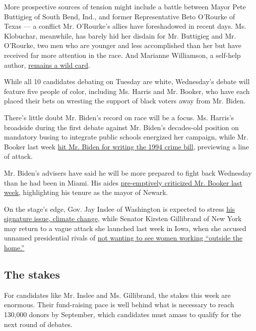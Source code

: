 More prospective sources of tension might include a battle between Mayor
Pete Buttigieg of South Bend, Ind., and former Representative Beto
O'Rourke of Texas --- a conflict Mr. O'Rourke's allies have foreshadowed
in recent days. Ms. Klobuchar, meanwhile, has barely hid her disdain for
Mr. Buttigieg and Mr. O'Rourke, two men who are younger and less
accomplished than her but have received far more attention in the race.
And Marianne Williamson, a self-help author,
\href{https://www.nytimes3xbfgragh.onion/2019/07/27/us/politics/marianne-williamson-mental-health.html}{remains
a wild card}.

While all 10 candidates debating on Tuesday are white, Wednesday's
debate will feature five people of color, including Ms. Harris and Mr.
Booker, who have each placed their bets on wresting the support of black
voters away from Mr. Biden.

There's little doubt Mr. Biden's record on race will be a focus. Ms.
Harris's broadside during the first debate against Mr. Biden's
decades-old position on mandatory busing to integrate public schools
energized her campaign, while Mr. Booker last week
\href{https://www.nytimes3xbfgragh.onion/2019/07/23/us/politics/biden-criminal-justice.html}{hit
Mr. Biden for writing the 1994 crime bill}, previewing a line of attack.

Mr. Biden's advisers have said he will be more prepared to fight back
Wednesday than he had been in Miami. His aides
\href{https://www.nytimes3xbfgragh.onion/2019/07/25/us/politics/biden-booker-black-voters.html}{pre-emptively
criticized Mr. Booker last week}, highlighting his tenure as the mayor
of Newark.

On the stage's edge, Gov. Jay Inslee of Washington is expected to stress
\href{https://www.nytimes3xbfgragh.onion/2019/05/24/us/politics/jay-inslee-climate-change.html}{his
signature issue, climate change}, while Senator Kirsten Gillibrand of
New York may return to a vague attack she launched last week in Iowa,
when she accused unnamed presidential rivals of
\href{https://www.nytimes3xbfgragh.onion/2019/07/26/us/politics/kirsten-gillibrand-2020.html}{not
wanting to see women working ``outside the home.''}

\hypertarget{the-stakes}{%
\subsection{The stakes}\label{the-stakes}}

For candidates like Mr. Inslee and Ms. Gillibrand, the stakes this week
are enormous. Their fund-raising pace is well behind what is necessary
to reach 130,000 donors by September, which candidates must amass to
qualify for the next round of debates.

